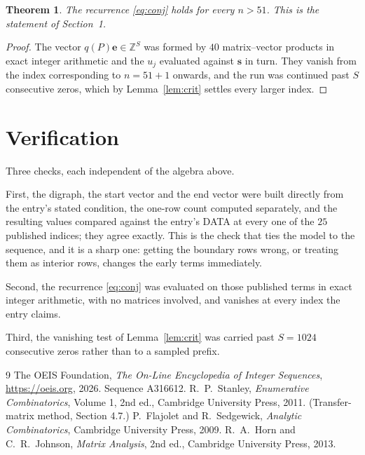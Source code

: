 \documentclass[11pt,a4paper]{article}
\theoremstyle{plain}
\newtheorem{theorem}{Theorem}
\theoremstyle{definition}
\begin{document}
\begin{theorem}
The recurrence \eqref{eq:conj} holds for every $n>51$. This is the statement of
Section~1.
\end{theorem}

\begin{proof}
The vector $q(P)\mathbf{e}\in\mathbb{Z}^{S}$ was formed by $40$ matrix--vector
products in exact integer arithmetic and the $u_j$ evaluated against $\mathbf{s}$ in turn.
They vanish from the index corresponding to $n=51+1$ onwards, and the run was continued
past $S$ consecutive zeros, which by Lemma~\ref{lem:crit} settles every larger index.
\end{proof}

\section{Verification}

Three checks, each independent of the algebra above.

First, the digraph, the start vector and the end vector were built directly from the
entry's stated condition, the one-row count computed separately, and the resulting values
compared against the entry's DATA at every one of the $25$ published indices; they
agree exactly. This is the check that ties the model to the sequence, and it is a sharp one:
getting the boundary rows wrong, or treating them as interior rows, changes the early terms
immediately.

Second, the recurrence \eqref{eq:conj} was evaluated on those published terms in exact
integer arithmetic, with no matrices involved, and vanishes at every index the entry claims.

Third, the vanishing test of Lemma~\ref{lem:crit} was carried past $S=1024$ consecutive
zeros rather than to a sampled prefix.

\begin{thebibliography}{9}
 The OEIS Foundation, \emph{The On-Line Encyclopedia of Integer
Sequences}, \url{https://oeis.org}, 2026. Sequence A316612.
 R.~P.~Stanley, \emph{Enumerative Combinatorics}, Volume 1, 2nd ed.,
Cambridge University Press, 2011. (Transfer-matrix method, Section 4.7.)
 P.~Flajolet and R.~Sedgewick, \emph{Analytic Combinatorics}, Cambridge
University Press, 2009.
 R.~A.~Horn and C.~R.~Johnson, \emph{Matrix Analysis}, 2nd ed., Cambridge
University Press, 2013.
\end{thebibliography}
\end{document}
